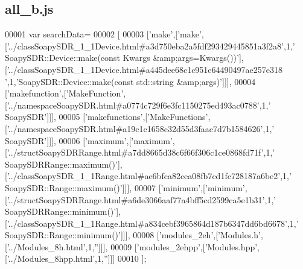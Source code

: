 \subsection{all\+\_\+b.\+js}
\label{all__b_8js_source}

\begin{DoxyCode}
00001 var searchData=
00002 [
00003   [\textcolor{stringliteral}{'make'},[\textcolor{stringliteral}{'make'},[\textcolor{stringliteral}{'../classSoapySDR\_1\_1Device.html#a3d750eba2a5fdf293429445851a3f2a8'},1,\textcolor{stringliteral}{'
      SoapySDR::Device::make(const Kwargs &amp;args=Kwargs())'}],[\textcolor{stringliteral}{'../classSoapySDR\_1\_1Device.html#a445dee68c1c951e64490497ae257e318
      '},1,\textcolor{stringliteral}{'SoapySDR::Device::make(const std::string &amp;args)'}]]],
00004   [\textcolor{stringliteral}{'makefunction'},[\textcolor{stringliteral}{'MakeFunction'},[\textcolor{stringliteral}{'../namespaceSoapySDR.html#a0774c729f6e3fc1150275ed493ac0788'},1,\textcolor{stringliteral}{'
      SoapySDR'}]]],
00005   [\textcolor{stringliteral}{'makefunctions'},[\textcolor{stringliteral}{'MakeFunctions'},[\textcolor{stringliteral}{'../namespaceSoapySDR.html#a19c1c1658c32d55d3faac7d7b1584626'},1,\textcolor{stringliteral}{'
      SoapySDR'}]]],
00006   [\textcolor{stringliteral}{'maximum'},[\textcolor{stringliteral}{'maximum'},[\textcolor{stringliteral}{'../structSoapySDRRange.html#a7dd8665d38c6f66f306c1ce0868fd71f'},1,\textcolor{stringliteral}{'
      SoapySDRRange::maximum()'}],[\textcolor{stringliteral}{'../classSoapySDR\_1\_1Range.html#ae6bfca82cea08fb7cd1fc728187a6be2'},1,\textcolor{stringliteral}{'
      SoapySDR::Range::maximum()'}]]],
00007   [\textcolor{stringliteral}{'minimum'},[\textcolor{stringliteral}{'minimum'},[\textcolor{stringliteral}{'../structSoapySDRRange.html#a6de3066aaf77a4bff5cd2599ca5e1b31'},1,\textcolor{stringliteral}{'
      SoapySDRRange::minimum()'}],[\textcolor{stringliteral}{'../classSoapySDR\_1\_1Range.html#a834cebf3965864d187b6347dd6bd6678'},1,\textcolor{stringliteral}{'
      SoapySDR::Range::minimum()'}]]],
00008   [\textcolor{stringliteral}{'modules\_2eh'},[\textcolor{stringliteral}{'Modules.h'},[\textcolor{stringliteral}{'../Modules\_8h.html'},1,\textcolor{stringliteral}{''}]]],
00009   [\textcolor{stringliteral}{'modules\_2ehpp'},[\textcolor{stringliteral}{'Modules.hpp'},[\textcolor{stringliteral}{'../Modules\_8hpp.html'},1,\textcolor{stringliteral}{''}]]]
00010 ];
\end{DoxyCode}
